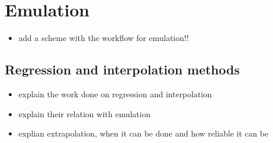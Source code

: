 \section{Emulation}
\begin{itemize}
\itemsep0em
  \item add a scheme with the workflow for emulation!!
\end{itemize}

\subsection{Regression and interpolation methods}

\begin{itemize}
\itemsep0em
  \item explain the work done on regression and interpolation
  \item explain their relation with emulation
  \item explian extrapolation, when it can be done and how reliable it can be
\end{itemize}


